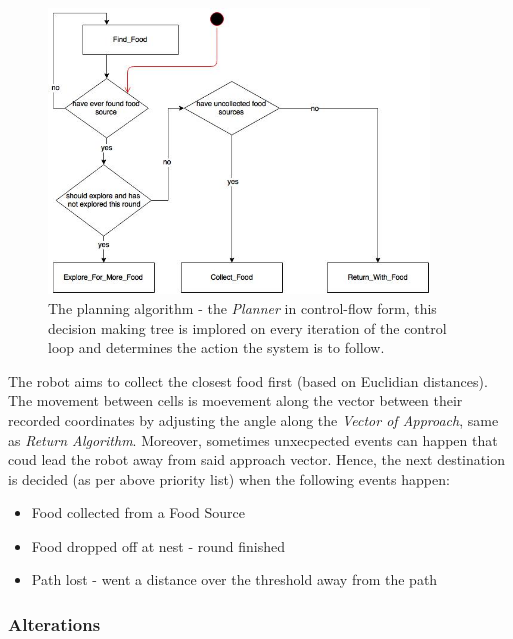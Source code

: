 \documentclass[11pt, a4paper]{article}
\begin{document}
\begin{figure}[H]
	  \centering
	  \includegraphics[width=0.9\textwidth]{../assets/fig_planner.jpg}
          \caption{The planning algorithm - the \textit{Planner} in control-flow form, this decision making tree is implored on every iteration of the control loop and determines the action the system is to follow.}
\end{figure} 

The robot aims to collect the closest food first (based on Euclidian distances). The movement 
between cells is moevement along the vector between their recorded coordinates by adjusting the 
angle along the \textit{Vector of Approach}, same as \textit{Return Algorithm}\cite{task2_report}. 
Moreover, sometimes unxecpected events can happen that coud lead the robot away from said approach 
vector. Hence, the next destination is decided (as per above priority list) when the following 
events happen:

\begin{itemize}

	\item Food collected from a Food Source
	\item Food dropped off at nest - round finished
	\item Path lost - went a distance over the threshold away from the path

\end{itemize}

\subsubsection{Alterations}
\label{Planner_Algorithm_Alterations}
\end{document}
